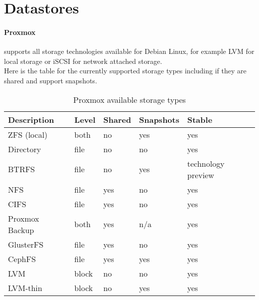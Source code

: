 \section{Datastores}

\paragraph{Proxmox} supports all storage technologies available for Debian Linux, for example LVM for local storage or iSCSI for network attached storage.
\\
Here is the table for the currently supported storage types including if they are shared and support snapshots.

\begin{table}[H]
    \label{tab:storageTable}
    \centering
    \caption{Proxmox available storage types}
    \begin{tabular}{|l|l|l|l|l|}
        \hline
        \textbf{Description} & \textbf{Level} & \textbf{Shared} & \textbf{Snapshots} & \textbf{Stable} \\ \hline
        ZFS (local)           & both           & no              & yes                & yes             \\ \hline
        Directory             & file           & no              & no                 & yes             \\ \hline
        BTRFS                 & file           & no              & yes                & technology preview \\ \hline
        NFS                   & file           & yes             & no                 & yes             \\ \hline
        CIFS                  & file           & yes             & no                 & yes             \\ \hline
        Proxmox Backup        & both           & yes             & n/a                & yes             \\ \hline
        GlusterFS             & file           & yes             & no                 & yes             \\ \hline
        CephFS                & file           & yes             & yes                & yes             \\ \hline
        LVM                   & block          & no              & no                 & yes             \\ \hline
        LVM-thin              & block          & no              & yes                & yes             \\ \hline

\end{tabular}
\end{table}
